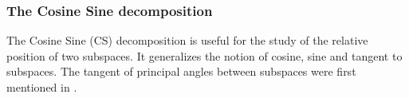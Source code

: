 \documentclass[twoside,11pt]{book}
\numberwithin{theorem}{chapter}
\numberwithin{definition}{chapter}
\numberwithin{proposition}{chapter}
\numberwithin{corollary}{chapter}
\numberwithin{example}{chapter}
\numberwithin{lemma}{chapter}
\begin{document}
%    

\subsubsection{The Cosine Sine decomposition}
The Cosine Sine (CS) decomposition is useful for the study of the relative position of two subspaces. It generalizes the notion of cosine, sine and tangent to subspaces. The tangent of principal angles between subspaces were first mentioned in \citealp{ZhKn13}.
\end{document}
